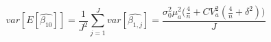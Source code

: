 \begin{equation}
\label{avgvar}
var[E[\hat{\beta_{10}}]] = \frac{1}{J^2}\sum\limits_{j=1}^{J}{var[\hat{\beta_{1,j}}]} = \frac{\sigma_0^2\mu_a^2\Big(\frac{4}{n} + CV_{a}^2(\frac{4}{n} + \delta^2)\Big)}{J}
\end{equation}